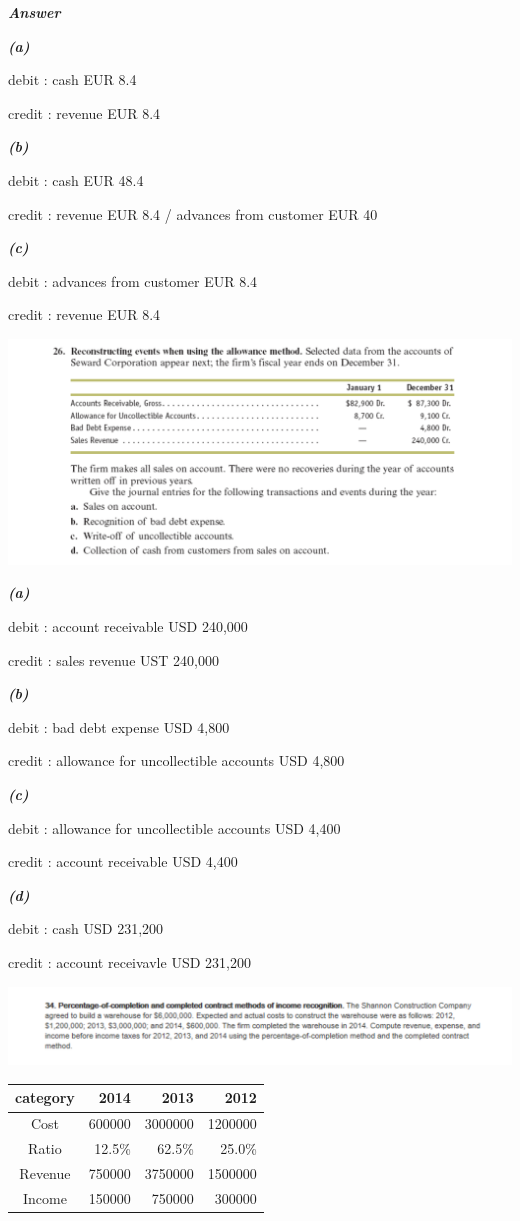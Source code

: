 \documentclass[
  letterpaper,
  DIV=11,
  numbers=noendperiod]{scrreprt}
\begin{document}
\textbf{\emph{Answer}}

\textbf{\emph{(a)}}

debit : cash EUR 8.4

credit : revenue EUR 8.4

\textbf{\emph{(b)}}

debit : cash EUR 48.4

credit : revenue EUR 8.4 / advances from customer EUR 40

\textbf{\emph{(c)}}

debit : advances from customer EUR 8.4

credit : revenue EUR 8.4

\includegraphics{images/재무회계8-26.png}

\textbf{\emph{(a)}}

debit : account receivable USD 240,000

credit : sales revenue UST 240,000

\textbf{\emph{(b)}}

debit : bad debt expense USD 4,800

credit : allowance for uncollectible accounts USD 4,800

\textbf{\emph{(c)}}

debit : allowance for uncollectible accounts USD 4,400

credit : account receivable USD 4,400

\textbf{\emph{(d)}}

debit : cash USD 231,200

credit : account receivavle USD 231,200

\includegraphics{images/재무회계8-34.png}

\begin{longtable}[]{@{}crrr@{}}
\toprule\noalign{}
category & 2014 & 2013 & 2012 \\
\midrule\noalign{}
\endhead
\bottomrule\noalign{}
\endlastfoot
Cost & 600000 & 3000000 & 1200000 \\
Ratio & 12.5\% & 62.5\% & 25.0\% \\
Revenue & 750000 & 3750000 & 1500000 \\
Income & 150000 & 750000 & 300000 \\
\end{longtable}
\end{document}
